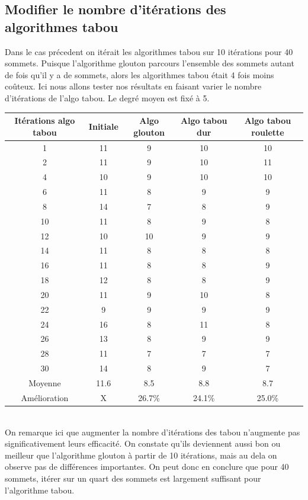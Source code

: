 \documentclass[a4paper,11pt]{article}
\begin{document}
	\subsection{Modifier le nombre d'itérations des algorithmes tabou}
		Dans le cas précedent on itérait les algorithmes tabou sur 10 itérations pour 40 sommets. Puisque l'algorithme glouton parcours l'ensemble des sommets autant de fois qu'il y a de sommets, alors les algorithmes tabou était 4 fois moins coûteux. Ici nous allons tester nos résultats en faisant varier le nombre d'itérations de l'algo tabou.
		Le degré moyen est fixé à 5.
		\begin{tabular}{|c|c|c|c|c|}
  		\hline
  		Itérations algo tabou & Initiale & Algo glouton & Algo tabou dur & Algo tabou roulette\\
  		\hline
  		1 & 11 & 9 & 10 & 10\\
  		\hline
  		2 & 11 & 9 & 10 & 11\\
  		\hline
  		4 & 10 & 9 & 10 & 10\\
  		\hline
  		6 & 11 & 8 & 9 & 9\\
  		\hline
  		8 & 14 & 7 & 8 & 9\\
  		\hline
  		10 & 11 & 8 & 9 & 8\\
  		\hline
  		12 & 10 & 10 & 9 & 9\\
  		\hline
  		14 & 11 & 8 & 8 & 8\\
  		\hline
  		16 & 11 & 8 & 8 & 9\\
  		\hline
  		18 & 12 & 8 & 8 & 9\\
  		\hline
  		20 & 11 & 9 & 10 & 8\\
  		\hline
  		22 & 9 & 9 & 9 & 9\\
  		\hline
  		24 & 16 & 8 & 11 & 8\\
  		\hline
  		26 & 13 & 8 & 9 & 9\\
  		\hline
  		28 & 11 & 7 & 7 & 7\\
  		\hline
  		30 & 14 & 8 & 9 & 7\\
  		\hline
  		Moyenne & 11.6 & 8.5 & 8.8 & 8.7\\
  		\hline
  		Amélioration & X & 26.7\% & 24.1\% & 25.0\%\\
  		\hline
	\end{tabular}
	\\
	On remarque ici que augmenter la nombre d'itérations des tabou n'augmente pas significativement leurs efficacité. On constate qu'ils deviennent aussi bon ou meilleur que l'algorithme glouton à partir de 10 itérations, mais au dela on observe pas de différences importantes. On peut donc en conclure que pour 40 sommets, itérer sur un quart des sommets est largement suffisant pour l'algorithme tabou.
\end{document}
